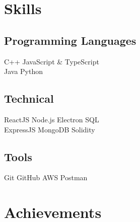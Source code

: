 \documentclass[]{deedy-resume-openfont}
\begin{document}
\begin{minipage}[t]{0.37\textwidth}

\section{Skills}

\subsection{Programming Languages}
\textbullet{} C++ \hspace{0.15cm}
\textbullet{} JavaScript {\&} TypeScript \\
\textbullet{} Java \hspace{0.15cm}
\textbullet{} Python \\
\sectionsep


\subsection{Technical}
\textbullet{} ReactJS \hspace{0.15cm}
\textbullet{} Node.js \hspace{0.15cm}
\textbullet{} Electron \hspace{0.15cm}
\textbullet{} SQL \\
\textbullet{} ExpressJS \hspace{0.15cm}
\textbullet{} MongoDB \hspace{0.15cm}
\textbullet{} Solidity \\
\sectionsep

\subsection{Tools}
\textbullet{} Git \hspace{0.15cm}
\textbullet{} GitHub \hspace{0.15cm}
\textbullet{} AWS \hspace{0.15cm}
\textbullet{} Postman \\
\sectionsep
\sectionsep


\section{Achievements}
\href{https://cic.niti.gov.in/fintech-open-month-hackathon.html#Winners}{
}
\end{minipage}
\end{document}
